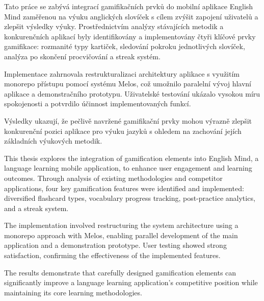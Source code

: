 \begin{abstract-czech}
    Tato práce se zabývá integrací gamifikačních prvků do mobilní aplikace English Mind zaměřenou na výuku anglických slovíček s cílem zvýšit zapojení uživatelů a zlepšit výsledky výuky. Prostřednictvím analýzy stávajících metodik a konkurenčních aplikací byly identifikovány a implementovány čtyři klíčové prvky gamifikace: rozmanité typy kartiček, sledování pokroku jednotlivých slovíček, analýza po skončení procvičování a streak systém.

    Implementace zahrnovala restrukturalizaci architektury aplikace s využitím monorepo přístupu pomocí systému Melos, což umožnilo paralelní vývoj hlavní aplikace a demonstračního prototypu. Uživatelské testování ukázalo vysokou míru spokojenosti a potvrdilo účinnost implementovaných funkcí.

    Výsledky ukazují, že pečlivě navržené gamifikační prvky mohou výrazně zlepšit konkurenční pozici aplikace pro výuku jazyků s ohledem na zachování jejích základních výukových metodik.
\end{abstract-czech}
    
\begin{abstract-english}
    This thesis explores the integration of gamification elements into English Mind, a language learning mobile application, to enhance user engagement and learning outcomes. Through analysis of existing methodologies and competitor applications, four key gamification features were identified and implemented: diversified flashcard types, vocabulary progress tracking, post-practice analytics, and a streak system.

    The implementation involved restructuring the system architecture using a monorepo approach with Melos, enabling parallel development of the main application and a demonstration prototype. User testing showed strong satisfaction, confirming the effectiveness of the implemented features.

    The results demonstrate that carefully designed gamification elements can significantly improve a language learning application's competitive position while maintaining its core learning methodologies.
\end{abstract-english}